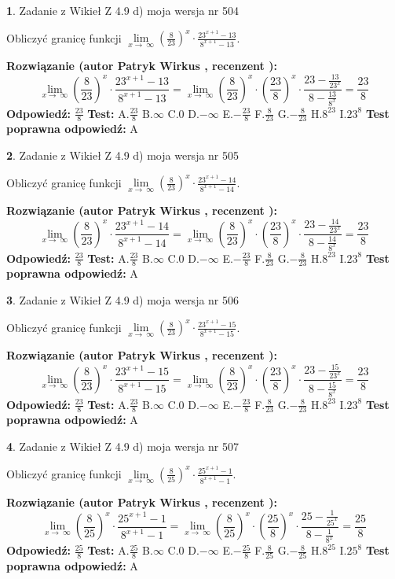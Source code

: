 \documentclass[12pt, a4paper]{article}
\theoremstyle{definition} %
\newtheorem{zad}{}
\newcommand{\zadStart}[1]{\begin{zad}#1\newline}
\newcommand{\zadStop}{\end{zad}}
\newcommand{\rozwStart}[2]{\noindent \textbf{Rozwiązanie (autor #1 , recenzent #2): }\newline}
\newcommand{\rozwStop}{\newline}
\newcommand{\odpStart}{\noindent \textbf{Odpowiedź:}\newline}
\newcommand{\odpStop}{\newline}
\newcommand{\testStart}{\noindent \textbf{Test:}\newline}
\newcommand{\testStop}{\newline}
\newcommand{\kluczStart}{\noindent \textbf{Test poprawna odpowiedź:}\newline}
\newcommand{\kluczStop}{\newline}
\begin{document}
\zadStart{Zadanie z Wikieł Z 4.9 d) moja wersja nr 504}


Obliczyć granicę funkcji  $\lim\limits_{x\to\ \infty}(\frac{8}{23})^{x}\cdot\frac{23^{x+1}-13}{8^{x+1}-13}$.
\zadStop
\rozwStart{Patryk Wirkus}{}
$$\lim\limits_{x\to\ \infty}(\frac{8}{23})^{x}\cdot\frac{23^{x+1}-13}{8^{x+1}-13}=\lim\limits_{x\to\ \infty}(\frac{8}{23})^{x}\cdot(\frac{23}{8})^{x} \cdot \frac{23-\frac{13}{23^{x}}}{8-\frac{13}{8^{x}}} = \frac{23}{8}$$
\rozwStop
\odpStart
$\frac{23}{8}$
\odpStop
\testStart
A.$\frac{23}{8}$ B.$\infty$ C.$0$ D.$-\infty$ E.$-\frac{23}{8}$
F.$\frac{8}{23}$ G.$-\frac{8}{23}$
H.$8^{23}$
I.$23^{8}$
\testStop
\kluczStart
A
\kluczStop



\zadStart{Zadanie z Wikieł Z 4.9 d) moja wersja nr 505}


Obliczyć granicę funkcji  $\lim\limits_{x\to\ \infty}(\frac{8}{23})^{x}\cdot\frac{23^{x+1}-14}{8^{x+1}-14}$.
\zadStop
\rozwStart{Patryk Wirkus}{}
$$\lim\limits_{x\to\ \infty}(\frac{8}{23})^{x}\cdot\frac{23^{x+1}-14}{8^{x+1}-14}=\lim\limits_{x\to\ \infty}(\frac{8}{23})^{x}\cdot(\frac{23}{8})^{x} \cdot \frac{23-\frac{14}{23^{x}}}{8-\frac{14}{8^{x}}} = \frac{23}{8}$$
\rozwStop
\odpStart
$\frac{23}{8}$
\odpStop
\testStart
A.$\frac{23}{8}$ B.$\infty$ C.$0$ D.$-\infty$ E.$-\frac{23}{8}$
F.$\frac{8}{23}$ G.$-\frac{8}{23}$
H.$8^{23}$
I.$23^{8}$
\testStop
\kluczStart
A
\kluczStop



\zadStart{Zadanie z Wikieł Z 4.9 d) moja wersja nr 506}


Obliczyć granicę funkcji  $\lim\limits_{x\to\ \infty}(\frac{8}{23})^{x}\cdot\frac{23^{x+1}-15}{8^{x+1}-15}$.
\zadStop
\rozwStart{Patryk Wirkus}{}
$$\lim\limits_{x\to\ \infty}(\frac{8}{23})^{x}\cdot\frac{23^{x+1}-15}{8^{x+1}-15}=\lim\limits_{x\to\ \infty}(\frac{8}{23})^{x}\cdot(\frac{23}{8})^{x} \cdot \frac{23-\frac{15}{23^{x}}}{8-\frac{15}{8^{x}}} = \frac{23}{8}$$
\rozwStop
\odpStart
$\frac{23}{8}$
\odpStop
\testStart
A.$\frac{23}{8}$ B.$\infty$ C.$0$ D.$-\infty$ E.$-\frac{23}{8}$
F.$\frac{8}{23}$ G.$-\frac{8}{23}$
H.$8^{23}$
I.$23^{8}$
\testStop
\kluczStart
A
\kluczStop



\zadStart{Zadanie z Wikieł Z 4.9 d) moja wersja nr 507}


Obliczyć granicę funkcji  $\lim\limits_{x\to\ \infty}(\frac{8}{25})^{x}\cdot\frac{25^{x+1}-1}{8^{x+1}-1}$.
\zadStop
\rozwStart{Patryk Wirkus}{}
$$\lim\limits_{x\to\ \infty}(\frac{8}{25})^{x}\cdot\frac{25^{x+1}-1}{8^{x+1}-1}=\lim\limits_{x\to\ \infty}(\frac{8}{25})^{x}\cdot(\frac{25}{8})^{x} \cdot \frac{25-\frac{1}{25^{x}}}{8-\frac{1}{8^{x}}} = \frac{25}{8}$$
\rozwStop
\odpStart
$\frac{25}{8}$
\odpStop
\testStart
A.$\frac{25}{8}$ B.$\infty$ C.$0$ D.$-\infty$ E.$-\frac{25}{8}$
F.$\frac{8}{25}$ G.$-\frac{8}{25}$
H.$8^{25}$
I.$25^{8}$
\testStop
\kluczStart
A
\kluczStop
\end{document}
